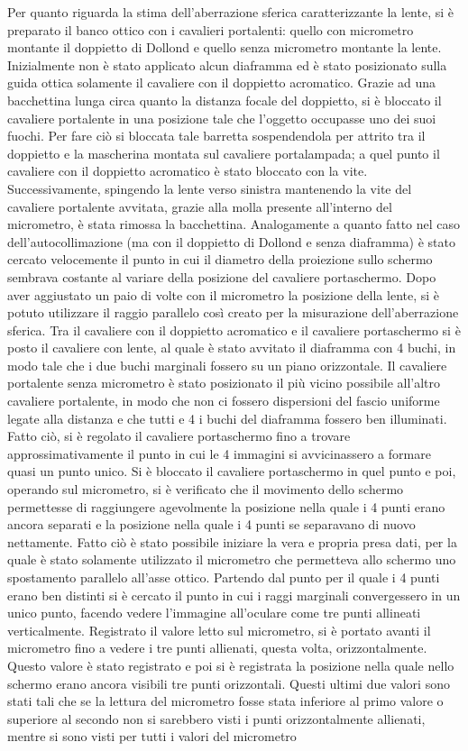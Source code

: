 Per quanto riguarda la stima dell'aberrazione sferica caratterizzante la lente, si è preparato il banco ottico con i cavalieri portalenti: quello con micrometro montante il doppietto di Dollond e quello senza micrometro montante la lente. Inizialmente non è stato applicato alcun diaframma ed è stato posizionato sulla guida ottica solamente il cavaliere con il doppietto acromatico. Grazie ad una bacchettina lunga circa quanto la distanza focale del doppietto, si è bloccato il cavaliere portalente in una posizione tale che l'oggetto occupasse uno dei suoi fuochi. Per fare ciò si bloccata tale barretta sospendendola per attrito tra il doppietto e la mascherina montata sul cavaliere portalampada; a quel punto il cavaliere con il doppietto acromatico è stato bloccato con la vite. Successivamente, spingendo la lente verso sinistra mantenendo la vite del cavaliere portalente avvitata, grazie alla molla presente all'interno del micrometro, è stata rimossa la bacchettina. Analogamente a quanto fatto nel caso dell'autocollimazione (ma con il doppietto di Dollond e senza diaframma) è stato cercato velocemente il punto in cui il diametro della proiezione sullo schermo sembrava costante al variare della posizione del cavaliere portaschermo. Dopo aver aggiustato un paio di volte con il micrometro la posizione della lente, si è potuto utilizzare il raggio parallelo cos\`i creato per la misurazione dell'aberrazione sferica. Tra il cavaliere con il doppietto acromatico e il cavaliere portaschermo si \`e posto il cavaliere con lente, al quale è stato avvitato il diaframma con 4 buchi, in modo tale che i due buchi marginali fossero su un piano orizzontale. Il cavaliere portalente senza micrometro è stato posizionato il più vicino possibile all'altro cavaliere portalente, in modo che non ci fossero dispersioni del fascio uniforme legate alla distanza e che tutti e 4 i buchi del diaframma fossero ben illuminati. Fatto ciò, si è regolato il cavaliere portaschermo fino a trovare approssimativamente il punto in cui le 4 immagini si avvicinassero a formare quasi un punto unico. Si è bloccato il cavaliere portaschermo in quel punto e poi, operando sul micrometro, si è verificato che il movimento dello schermo permettesse di raggiungere agevolmente la posizione nella quale i 4 punti erano ancora separati e la posizione nella quale i 4 punti se separavano di nuovo nettamente. Fatto ciò è stato possibile iniziare la vera e propria presa dati, per la quale è stato solamente utilizzato il micrometro che permetteva allo schermo uno spostamento parallelo all'asse ottico. Partendo dal punto per il quale i 4 punti erano ben distinti si è cercato il punto in cui i raggi marginali convergessero in un unico punto, facendo vedere l'immagine all'oculare come tre punti allineati verticalmente. Registrato il valore letto sul micrometro, si è portato avanti il micrometro fino a vedere i tre punti allienati, questa volta, orizzontalmente. Questo valore è stato registrato e poi si è registrata la posizione nella quale nello schermo erano ancora visibili tre punti orizzontali. Questi ultimi due valori sono stati tali che se la lettura del micrometro fosse stata inferiore al primo valore o superiore al secondo non si sarebbero visti i punti orizzontalmente allienati, mentre si sono visti per tutti i valori del micrometro 